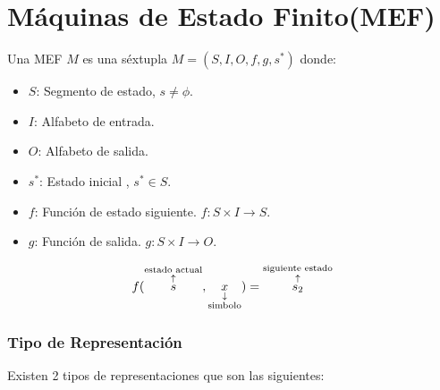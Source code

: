 \chapter{Máquinas de Estado Finito(MEF)}

Una MEF $M$ es una séxtupla $M=(S,I,O,f,g,s^*)$ donde:

\begin{itemize}
\item $S$: Segmento de estado, $s\not=\phi$.
\item $I$: Alfabeto de entrada.
\item $O$: Alfabeto de salida.
\item $s^*$: Estado inicial , $s^*\in S$.
\item $f$: Función de estado siguiente. $f:S\times I \rightarrow S$.
\item $g$: Función de salida. $g:S\times I \rightarrow O$.
\end{itemize}

$$ f(\uplegend{s}{estado actual},\downlegend{x}{simbolo})=\uplegend{s_2}{siguiente estado}$$ %
\subsection{Tipo de Representación}
Existen 2 tipos de representaciones que son las siguientes:


